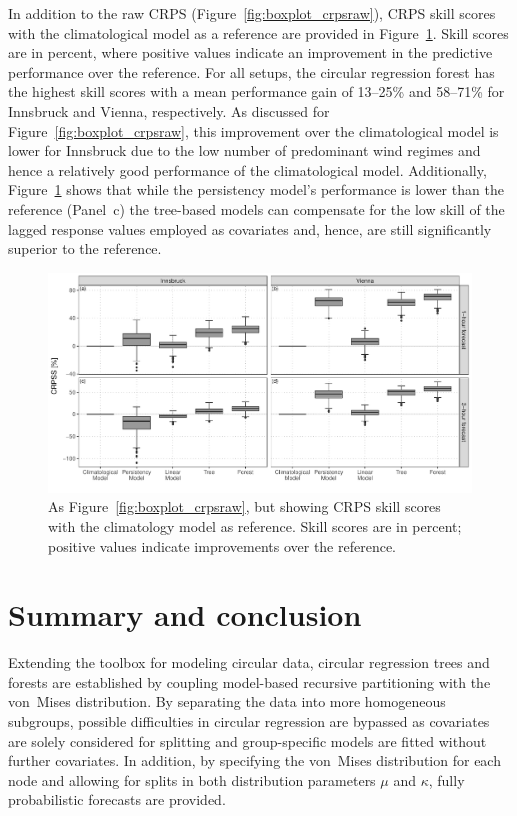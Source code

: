 \documentclass[nojss,shortnames]{jss}
\numberwithin{equation}{section}
\begin{document}
In addition to the raw CRPS (Figure~\ref{fig:boxplot_crpsraw}), CRPS skill
scores with the climatological model as a reference are provided in
Figure~\ref{fig:boxplot_crpsskill}. Skill scores are in percent, where positive
values indicate an improvement in the predictive performance over the
reference. For all setups, the circular regression forest has the highest skill
scores with a mean performance gain of 13--25\% and 58--71\% for Innsbruck and
Vienna, respectively. As discussed for Figure~\ref{fig:boxplot_crpsraw}, this
improvement over the climatological model is lower for Innsbruck due to the low
number of predominant wind regimes and hence a relatively good performance of
the climatological model. Additionally, Figure~\ref{fig:boxplot_crpsskill}
shows that while the persistency model's performance is lower than the
reference (Panel~c) the tree-based models can compensate for the low skill of
the lagged response values employed as covariates and, hence, are still
significantly superior to the reference.

\begin{figure}[t]
  \centering
  \includegraphics{_plot_circforest_validation_crpsskill_agg_comparison_with_lowff_v14b.pdf}
  \caption{As Figure~\ref{fig:boxplot_crpsraw}, but showing CRPS skill scores
    with the climatology model as reference. Skill scores are in percent; positive
    values indicate improvements over the reference.} 
  \label{fig:boxplot_crpsskill} 
\end{figure}

\section{Summary and conclusion}
\label{sec:summary}
Extending the toolbox for modeling circular data, circular regression trees and
forests are established by coupling model-based recursive partitioning with the
von~Mises distribution. By separating the data into more homogeneous subgroups,
possible difficulties in circular regression are bypassed as covariates are
solely considered for splitting and group-specific models are fitted without
further covariates. In addition, by specifying the von~Mises distribution for
each node and allowing for splits in both distribution parameters $\mu$ and
$\kappa$, fully probabilistic forecasts are provided.
\end{document}
